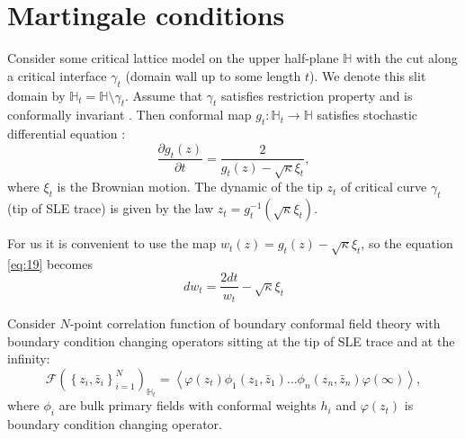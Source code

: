 \documentclass{jetpl}
\begin{document}
\section{Martingale conditions}
\label{sec:mart-cond}


 Consider some critical lattice model on the upper half-plane $\mathbb{H}$ with the cut along a critical interface $\gamma_{t}$ (domain wall up to some length $t$). We denote this slit domain by $\mathbb{H}_{t}=\mathbb{H}\setminus \gamma_{t}$.  Assume that $\gamma_{t}$ satisfies restriction property and is conformally  invariant \cite{Cardy:2005kh}. Then  conformal map  $g_{t}:\mathbb{H}_{t}\to \mathbb{H}$ satisfies stochastic differential equation \cite{schramm2000scaling}:
\begin{equation}
\label{eq:19}
  \frac{\partial g_t(z)}{\partial t} = \frac{ 2}{g_t(z)-\sqrt{\kappa}\xi_{t}} ,
\end{equation}
where $\xi_{t}$ is the Brownian motion. The dynamic of the tip $z_{t}$ of critical curve $\gamma_{t}$ (tip of SLE trace) is given by the law $z_{t}=g_{t}^{-1}(\sqrt{\kappa}\xi_{t})$. 

For us it is convenient to use the map $w_{t} (z)=g_{t}(z)-\sqrt{\kappa}\xi_{t}$, so the equation \eqref{eq:19} becomes
\begin{equation}
  \label{eq:20}
       d w _{t}= \frac{2dt}{w_{t} }-\sqrt{\kappa}\xi_{t}  
\end{equation}

Consider  $N$-point correlation function of boundary conformal field theory with boundary condition changing operators sitting at the tip of SLE trace and at the infinity:
\begin{equation}
  \mathcal{F}(\left\{z_{i},\bar z_{i}\right\}_{i=1}^{N})_{\mathbb{H}_{t}}=
\left<\varphi(z_{t}) \phi_{1}(z_{1},\bar z_{1}) \dots \phi_{n}(z_{n},\bar z_{n})
      \varphi(\infty)\right>,
    \label{eq:2}
\end{equation}
where $\phi_{i}$ are bulk primary fields with conformal weights $h_i$ and $\varphi(z_{t})$ is boundary condition changing operator.
\end{document}
